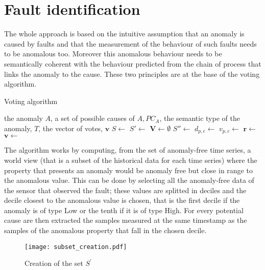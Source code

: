 \section{Fault identification}
The whole approach is based on the intuitive assumption that an anomaly is caused by faults and that the measurement of the behaviour of such faults needs to be anomalous too. Moreover this anomalous behaviour needs to be semantically coherent with the behaviour predicted from the chain of process that links the anomaly to the cause. These two principles are at the base of the voting algorithm.
\begin{algorithm}
  \caption{Voting algorithm}\label{diagnosis}
  \begin{algorithmic}[1]
    \Require
      \Statex the anomaly $A$,
      \Statex a set of possible causes of $ A, PC_A$,
      \Statex the semantic type of the anomaly, $T$,
    \Ensure the vector of votes, $\bm v$
    \State $S\leftarrow$ 
    \State $S'\leftarrow$ 
    \State $\bm V\leftarrow\emptyset$
    \State $S''\leftarrow$ 
    \State $d_{p,c}\leftarrow$ 
    \State $v_{p,c}\leftarrow$ 
    \EndFor
    \State $\bm r\leftarrow$ 
    \State $\bm v\leftarrow$ 
    \EndFor
    \EndProcedure
  \end{algorithmic}
\end{algorithm}
The algorithm works by computing, from the set of anomaly-free time series, a world view (that is a subset of the historical data for each time series) where the property that presents an anomaly would be anomaly free but close in range to the anomalous value. This can be done by selecting all the anomaly-free data of the sensor that observed the fault; these values are splitted in deciles and the decile closest to the anomalous value is chosen, that is the first decile if the anomaly is of type Low or the tenth if it is of type High. For every potential cause are then extracted the samples measured at the same timestamp as the samples of the anomalous property that fall in the chosen decile.
\begin{figure}
  \centering
  \texttt{[image: subset\_creation.pdf]}
  \caption{Creation of the set $S^{'}$}
  \label{fig:subsets}
\end{figure}
